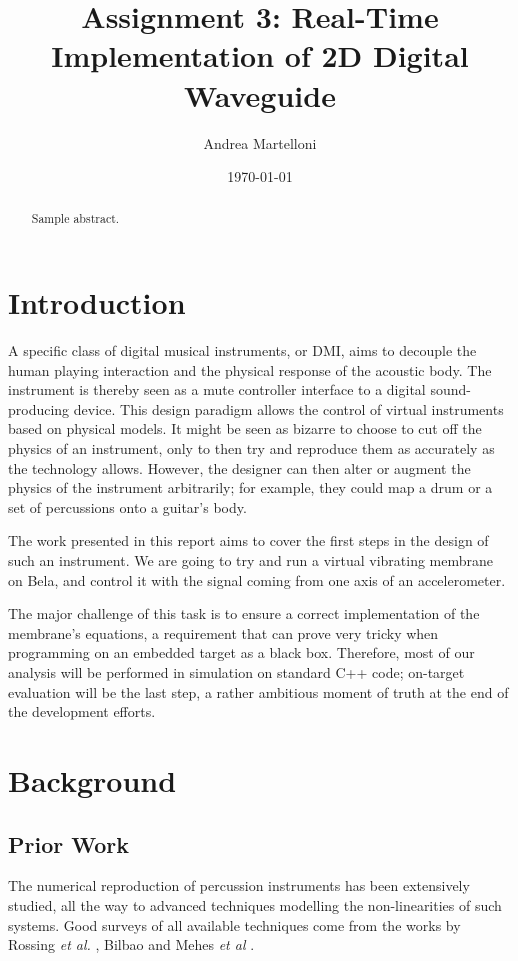 \documentclass{article}
\title{Assignment 3: Real-Time Implementation of 2D
Digital Waveguide\\
[0.2em]\smaller{ECS7012P Music and Audio Programming}}
\author{Andrea Martelloni}
\date{\today}
\begin{document}
\maketitle


\begin{abstract}
Sample abstract.
\end{abstract}

\section{Introduction}

A specific class of digital musical instruments, or DMI, aims to
decouple the human playing interaction and the physical response
of the acoustic body. The instrument is thereby seen as a mute
controller interface to a digital sound-producing device.
This design paradigm allows the control of virtual instruments
based on physical models. It might be seen as bizarre to choose to
cut off the physics of an instrument, only to then try and
reproduce them as accurately as the technology allows. However,
the designer can then alter or augment the physics of the
instrument arbitrarily; for example, they could map a drum
or a set of percussions onto a guitar's body.

The work presented in this report aims to cover the first steps
in the design of such an instrument. We are going to try and
run a virtual vibrating membrane on Bela, and control it with
the signal coming from one axis of an accelerometer.

The major challenge of this task is to
ensure a correct implementation of the membrane's equations,
a requirement that can prove very tricky when programming on
an embedded target as a black box. Therefore, most of our analysis
will be performed in simulation on standard C++ code; on-target
evaluation will be the last step, a rather ambitious moment
of truth at the end of the development efforts.

\section{Background}

\subsection{Prior Work}

The numerical reproduction of percussion instruments has been
extensively studied, all the way to advanced techniques
modelling the non-linearities of such systems. Good surveys of
all available techniques come from the works by
Rossing \emph{et al.} \cite{rossing2004acoustics},
Bilbao \cite{bilbao2009modular}
and Mehes \emph{et al} \cite{mehes2017virtual}.
\end{document}
